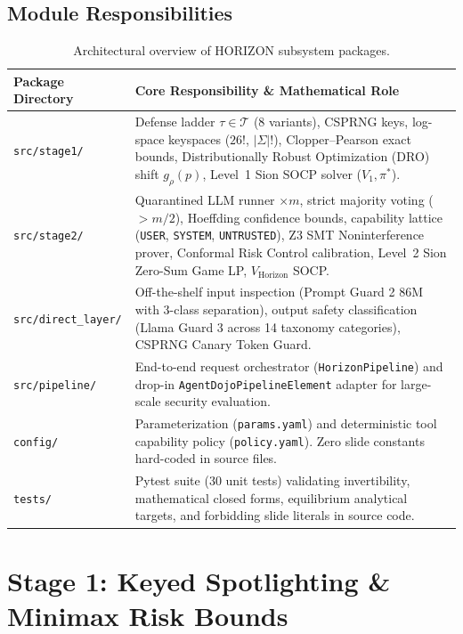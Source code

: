 \documentclass[10pt,a4paper]{article}
\begin{document}
\subsection{Module Responsibilities}
\begin{table}[htbp]
\centering
\small
\caption{Architectural overview of HORIZON subsystem packages.}
\label{tab:modules}
\begin{tabular}{lp{12.5cm}}
\toprule
\textbf{Package Directory} & \textbf{Core Responsibility \& Mathematical Role} \\
\midrule
\texttt{src/stage1/} & Defense ladder $\tau \in \mathcal{T}$ (8 variants), CSPRNG keys, log-space keyspaces ($26!$, $|\Sigma|!$), Clopper--Pearson exact bounds, Distributionally Robust Optimization (DRO) shift $g_\rho(p)$, Level~1 Sion SOCP solver ($V_1, \pi^*$). \\
\addlinespace
\texttt{src/stage2/} & Quarantined LLM runner $\times m$, strict majority voting ($> m/2$), Hoeffding confidence bounds, capability lattice (\texttt{USER}, \texttt{SYSTEM}, \texttt{UNTRUSTED}), Z3 SMT Noninterference prover, Conformal Risk Control calibration, Level~2 Sion Zero-Sum Game LP, $V_{\mathrm{Horizon}}$ SOCP. \\
\addlinespace
\texttt{src/direct\_layer/} & Off-the-shelf input inspection (Prompt Guard 2 86M with 3-class separation), output safety classification (Llama Guard 3 across 14 taxonomy categories), CSPRNG Canary Token Guard. \\
\addlinespace
\texttt{src/pipeline/} & End-to-end request orchestrator (\texttt{HorizonPipeline}) and drop-in \texttt{AgentDojoPipelineElement} adapter for large-scale security evaluation. \\
\addlinespace
\texttt{config/} & Parameterization (\texttt{params.yaml}) and deterministic tool capability policy (\texttt{policy.yaml}). Zero slide constants hard-coded in source files. \\
\addlinespace
\texttt{tests/} & Pytest suite (30 unit tests) validating invertibility, mathematical closed forms, equilibrium analytical targets, and forbidding slide literals in source code. \\
\bottomrule
\end{tabular}
\end{table}

\clearpage
\section{Stage 1: Keyed Spotlighting \& Minimax Risk Bounds}
\label{sec:stage1}
\end{document}
